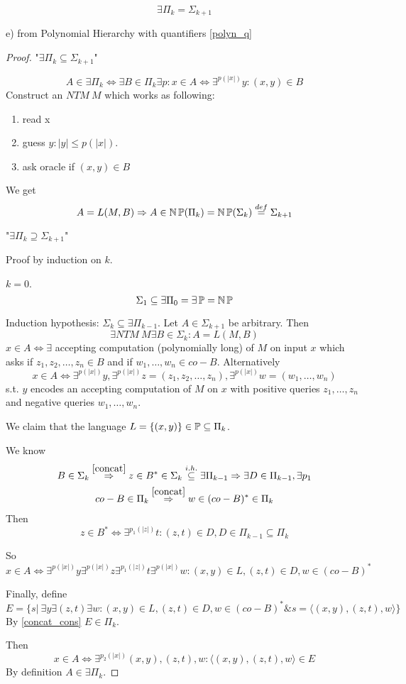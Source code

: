 \begin{theorem}
	\[ \exists \Pi_k = \Sigma_{k + 1} \]

	e) from Polynomial Hierarchy with quantifiers \cref{polyn_q}
\end{theorem}
\begin{proof}
	"$\exists \Pi_k \subseteq \Sigma_{k + 1}$"

	\[ A \in \exists \Pi_k \iff \exists B \in \Pi_k \exists p: x \in A \iff \exists^{p(|x|)} y: (x,y) \in B \]
	Construct an $NTM\ M$ which works as following:
	\begin{enumerate}
		\item read x
		\item guess $y: |y| \leq p(|x|)$.
		\item ask oracle if $(x,y) \in B$
	\end{enumerate}

	We get
	\[ A = L(M, B) \Rightarrow A \in \operatorname{\operatorname{\mathbb{N}}\mathbb{P}}(\Pi_k) = \operatorname{\operatorname{\mathbb{N}}\mathbb{P}}(\Sigma_k) \stackrel{def}{=} \Sigma_{k + 1} \]

	"$\exists \Pi_k \supseteq \Sigma_{k + 1}$"

	Proof by induction on $k$.

	$k = 0$.
	\[ \Sigma_1 \subseteq \exists \Pi_0 = \exists \operatorname{\mathbb{P}} = \operatorname{\operatorname{\mathbb{N}}\mathbb{P}} \]

	Induction hypothesis: $\Sigma_k \subseteq \exists \Pi_{k - 1}$.
	Let $A \in \Sigma_{k + 1}$ be arbitrary.
	Then
	\[ \exists NTM\ M \exists B \in \Sigma_k: A = L(M, B) \]
	$x \in A \iff \exists$ accepting computation (polynomially long) of $M$ on input $x$ which asks if $z_1, z_2, \ldots, z_n \in B$ and if $w_1, \ldots, w_n \in co-B$.
	Alternatively
	\[ x \in A \iff \exists^{p(|x|)} y, \exists^{p(|x|)} z = (z_1, z_2, \ldots, z_n), \exists^{p(|x|)} w = (w_1, \ldots, w_n)\]
	s.t. $y$ encodes an accepting computation of $M$ on $x$ with positive queries $z_1, \ldots, z_n$ and negative queries $w_1, \ldots, w_n$.

	We claim that the language $L = \{ (x, y) \} \in \operatorname{\mathbb{P}} \subseteq \Pi_k$.

	We know
	\begin{gather*}
		B \in \Sigma_k \stackrel{\cref{concat}}{\Rightarrow} z \in B^{\ast} \in \Sigma_k \stackrel{i.h.}{\subseteq} \exists \Pi_{k - 1} \Rightarrow \exists D \in \Pi_{k - 1}, \exists p_1 \\
		co-B \in \Pi_k \stackrel{\cref{concat}}{\Rightarrow} w \in (co-B)^{\ast} \in \Pi_k
	\end{gather*}
	Then
	\[ z \in B^{\ast} \iff \exists^{p_1(|z|)} t: (z, t) \in D, D \in \Pi_{k - 1} \subseteq \Pi_k \]

	So
	\[x \in A \iff \exists^{p(|x|)} y \exists^{p(|x|)} z \exists^{p_1(|z|)} t \exists^{p(|x|)} w : (x, y) \in L, (z, t) \in D, w \in (co-B)^{\ast} \]

	Finally, define
	\[ E = \{ s |\ \exists y \exists (z, t) \exists w: (x, y) \in L, (z, t) \in D, w \in (co-B)^{\ast} \& s = \langle (x, y), (z, t), w \rangle \} \]
	By \cref{concat_cons} $E \in \Pi_k$.

	Then
	\[x \in A \iff \exists^{p_2(|x|)} (x, y), (z, t), w: \langle (x, y), (z, t), w \rangle \in E \]
	By definition $A \in \exists \Pi_k$.
\end{proof}

